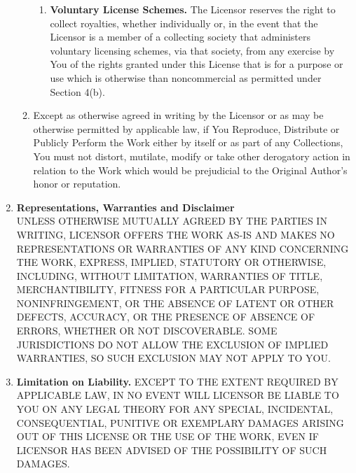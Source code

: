 \begin{enumerate}
\begin{enumerate}
\begin{enumerate}
      \item {\textbf{Voluntary License Schemes.} The Licensor reserves the right
      to collect royalties, whether individually or, in the event that the
      Licensor is a member of a collecting society that administers voluntary
      licensing schemes, via that society, from any exercise by You of the
      rights granted under this License that is for a purpose or use which is
      otherwise than noncommercial as permitted under Section 4(b).}
    \end{enumerate} 
    \item {Except as otherwise agreed in writing by the Licensor or as may be
    otherwise permitted by applicable law, if You Reproduce, Distribute or
    Publicly Perform the Work either by itself or as part of any Collections,
    You must not distort, mutilate, modify or take other derogatory action in
    relation to the Work which would be prejudicial to the Original Author's
    honor or reputation.}
  \end{enumerate}

  \item {\textbf{Representations, Warranties and Disclaimer}} \\

UNLESS OTHERWISE MUTUALLY AGREED BY THE PARTIES IN WRITING, LICENSOR OFFERS THE
WORK AS-IS AND MAKES NO REPRESENTATIONS OR WARRANTIES OF ANY KIND CONCERNING THE
WORK, EXPRESS, IMPLIED, STATUTORY OR OTHERWISE, INCLUDING, WITHOUT LIMITATION,
WARRANTIES OF TITLE, MERCHANTIBILITY, FITNESS FOR A PARTICULAR PURPOSE,
NONINFRINGEMENT, OR THE ABSENCE OF LATENT OR OTHER DEFECTS, ACCURACY, OR THE
PRESENCE OF ABSENCE OF ERRORS, WHETHER OR NOT DISCOVERABLE. SOME JURISDICTIONS
DO NOT ALLOW THE EXCLUSION OF IMPLIED WARRANTIES, SO SUCH EXCLUSION MAY NOT
APPLY TO YOU.

  \item {\textbf{Limitation on Liability.} EXCEPT TO THE EXTENT REQUIRED BY
  APPLICABLE LAW, IN NO EVENT WILL LICENSOR BE LIABLE TO YOU ON ANY LEGAL THEORY
  FOR ANY SPECIAL, INCIDENTAL, CONSEQUENTIAL, PUNITIVE OR EXEMPLARY DAMAGES
  ARISING OUT OF THIS LICENSE OR THE USE OF THE WORK, EVEN IF LICENSOR HAS BEEN
  ADVISED OF THE POSSIBILITY OF SUCH DAMAGES.}


\end{enumerate}
